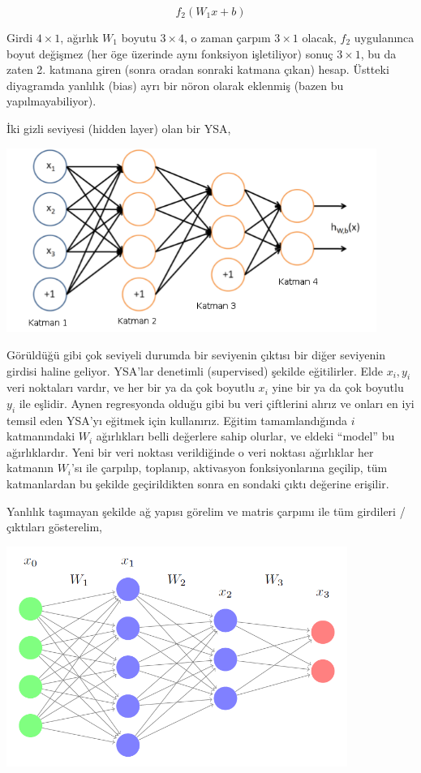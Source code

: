 \documentclass[12pt,fleqn]{article}\usepackage{../../common}
\begin{document}
$$ f_2 (W_1x + b) $$

Girdi $4 \times 1$, ağırlık $W_1$ boyutu $3 \times 4$, o zaman çarpım
$3 \times 1$ olacak, $f_2$ uygulanınca boyut değişmez (her öge üzerinde
aynı fonksiyon işletiliyor) sonuç $3 \times 1$, bu da zaten 2. katmana
giren (sonra oradan sonraki katmana çıkan) hesap. Üstteki diyagramda
yanlılık (bias) ayrı bir nöron olarak eklenmiş (bazen bu yapılmayabiliyor).

İki gizli seviyesi (hidden layer) olan bir YSA,

\includegraphics[height=6cm]{mlp_05.png}

Görüldüğü gibi çok seviyeli durumda bir seviyenin çıktısı bir diğer
seviyenin girdisi haline geliyor. YSA'lar denetimli (supervised) şekilde
eğitilirler. Elde $x_i,y_i$ veri noktaları vardır, ve her bir ya da çok
boyutlu $x_i$ yine bir ya da çok boyutlu $y_i$ ile eşlidir. Aynen
regresyonda olduğu gibi bu veri çiftlerini alırız ve onları en iyi temsil
eden YSA'yı eğitmek için kullanırız. Eğitim tamamlandığında $i$
katmanındaki $W_i$ ağırlıkları belli değerlere sahip olurlar, ve eldeki
``model'' bu ağırlıklardır. Yeni bir veri noktası verildiğinde o veri
noktası ağırlıklar her katmanın $W_i$'sı ile çarpılıp, toplanıp, aktivasyon
fonksiyonlarına geçilip, tüm katmanlardan bu şekilde geçirildikten sonra en
sondaki çıktı değerine erişilir.

Yanlılık taşımayan şekilde ağ yapısı görelim ve matris çarpımı ile tüm
girdileri /  çıktıları gösterelim,

\includegraphics[width=30em]{nn_nobias.PNG}
\end{document}
